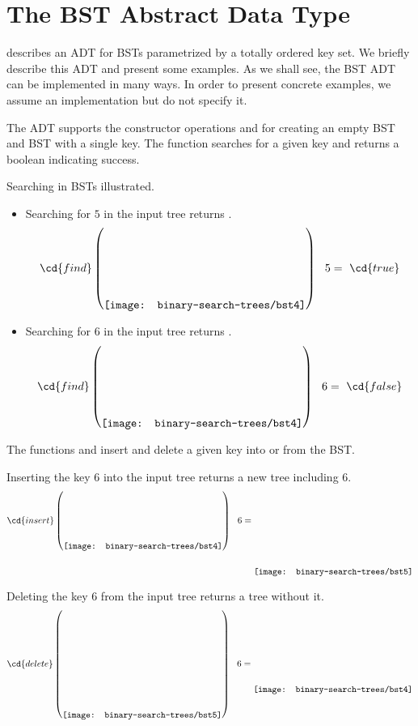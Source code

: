 \section{The BST Abstract Data Type}
\label{sec:bst::adt}

\newcommand{\bstt}{\tttt}


 describes an ADT for BSTs parametrized by a totally
ordered key set. We briefly describe this ADT and present some
examples. As we shall see, the BST ADT can be implemented in many
ways.  In order to present concrete examples, we assume an
implementation but do not specify it.




The ADT supports the constructor operations
 and  for creating an empty BST and BST
with a single key. 
%
The function  searches for a given key and returns a
boolean indicating success.
%
\begin{simpleexample}
Searching in BSTs illustrated.

\begin{itemize}
\item 
Searching for  $5$  in the input tree returns .
%
\[
\cd{find}
\left(
\raisebox{-.45in}{\texttt{[image: binary-search-trees/bst4]}}
\right) 
~~5
=
~\cd{true}
\]

\item 
Searching for  $6$  in the input tree returns .
%
\[
\cd{find}
\left(
\raisebox{-.45in}{\texttt{[image: binary-search-trees/bst4]}}
\right) 
~~6
= \
\cd{false}
\]

\end{itemize}
\end{simpleexample}


%
The functions  and  insert and delete a
given key into or from the BST.
%
\begin{example}
Inserting the key $6$  into the input tree returns a new tree including $6$.
%
\[
\cd{insert}
\left(
\raisebox{-10mm}{\texttt{[image: binary-search-trees/bst4]}}
\right) 
~~6
=
\raisebox{-20mm}{\texttt{[image: binary-search-trees/bst5]}}
\]
\end{example}

\begin{example}
Deleting the key  $6$ from the input tree returns a tree without it.
%
\[
\cd{delete}
\left(
\raisebox{-20mm}{\texttt{[image: binary-search-trees/bst5]}}
\right) 
~~6
= 
\raisebox{-10mm}{\texttt{[image: binary-search-trees/bst4]}}
\]

\end{example}


